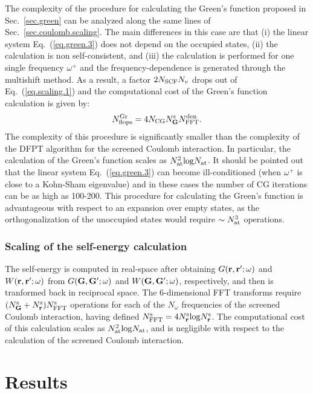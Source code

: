 \documentclass[twocolumn,prb,showpacs,superscriptaddress]{revtex4}
\def\w{\omega}
\def\G{{\bf G}}
\def\Gp{{\bf G^\prime}}
\def\r{{\bf r}}
\def\rp{{\bf r^\prime}}
\begin{document}
The complexity of the procedure for calculating the Green's function proposed
in Sec.\ \ref{sec.green} can be analyzed along the same
lines of Sec.\ \ref{sec.coulomb.scaling}. The main differences in this case are that (i) the linear system
Eq.\ (\ref{eq.green.3}) does not depend on the occupied states,
(ii) the calculation is non self-consistent, and (iii) the calculation is performed
for one single frequency $\w^+$ and the frequency-dependence is generated
through the multishift method. As a result, a factor $2 N_{\rm SCF} N_v$ drops out
of Eq.\ (\ref{eq.scaling.1}) and the computational cost of the Green's function
calculation is given by:
   \begin{equation}\label{eq.scaling.3}
   N^{\rm Gr}_{\rm flops} = 4 N_{\rm CG} N_\G^{\rm s} N^{\rm den}_{\rm FFT}.
   \end{equation}
The complexity of this procedure is significantly smaller than the complexity
of the DFPT algorithm for the screened Coulomb interaction. In particular, the
calculation of the Green's function scales as $N_{\rm at}^2 {\rm log} N_{\rm at}$.
It should be pointed out that the linear system Eq.\ (\ref{eq.green.3}) can become
ill-conditioned (when $\w^+$ is close to a Kohn-Sham eigenvalue) and in these cases
the number of CG iterations can be as high as 100-200.
This procedure for calculating the Green's function is advantageous
with respect to an expansion over empty states, as the orthogonalization
of the unoccupied states would require $\sim N_{\rm at}^3$ operations.

\subsubsection{Scaling of the self-energy calculation}\label{sec.sigma.scaling}

The self-energy is computed in real-space after obtaining $G(\r,\rp;\w)$ and $W(\r,\rp;\w)$ 
from $G(\G,\Gp;\w)$ and $W(\G,\Gp;\w)$, respectively, and then is tranformed back in reciprocal space.
The 6-dimensional FFT transforms require $(N_\G^{\rm s}+N_\r^{\rm s})N^{\rm s}_{\rm FFT}$
operations for each of the $N_\w$ frequencies of the screened Coulomb interaction,
having defined $N^{\rm s}_{\rm FFT}=4 N_\r^{\rm s} {\rm log} N_\r^{\rm s}$.
The computational cost of this calculation scales as $N_{\rm at}^2 {\rm log} N_{\rm at}$,
and is negligible with respect to the calculation of the screened
Coulomb interaction.

\section{Results}\label{sec.results}
\end{document}
